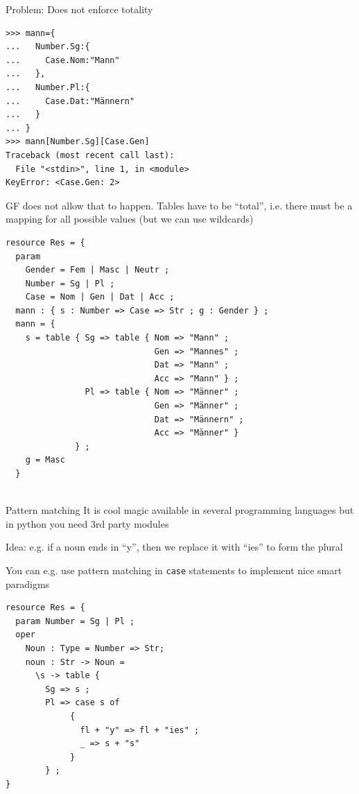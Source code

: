 \documentclass{beamer}
\begin{document}
\begin{frame}[fragile]
Problem: Does not enforce totality
\begin{verbatim}
>>> mann={
...   Number.Sg:{
...     Case.Nom:"Mann"
...   },
...   Number.Pl:{
...     Case.Dat:"Männern"
...   }
... }
>>> mann[Number.Sg][Case.Gen]
Traceback (most recent call last):
  File "<stdin>", line 1, in <module>
KeyError: <Case.Gen: 2>
\end{verbatim}
GF does not allow that to happen. Tables have to be ``total'', i.e. there must be a mapping for all possible values (but we can use wildcards)
\end{frame}

\begin{frame}[fragile]
  \begin{lstlisting}
resource Res = {
  param
    Gender = Fem | Masc | Neutr ;
    Number = Sg | Pl ;
    Case = Nom | Gen | Dat | Acc ;
  mann : { s : Number => Case => Str ; g : Gender } ;
  mann = {
    s = table { Sg => table { Nom => "Mann" ;
                              Gen => "Mannes" ;
                              Dat => "Mann" ;
                              Acc => "Mann" } ;
                Pl => table { Nom => "Männer" ;
                              Gen => "Männer" ;
                              Dat => "Männern" ;
                              Acc => "Männer" }
              } ;
    g = Masc
  }
    
  \end{lstlisting}
\end{frame}

\begin{frame}{Pattern matching}
  It is cool magic available in several programming languages but in python you need 3rd party modules

  Idea: e.g. if a noun ends in ``y'', then we replace it with ``ies'' to form the plural

  You can e.g. use pattern matching in \texttt{case} statements to implement nice smart paradigms
\end{frame}

\begin{frame}[fragile]
  \begin{lstlisting}
resource Res = {
  param Number = Sg | Pl ;
  oper
    Noun : Type = Number => Str;
    noun : Str -> Noun =
      \s -> table {
        Sg => s ; 
        Pl => case s of
             { 
               fl + "y" => fl + "ies" ;
               _ => s + "s"
             }
        } ;
}

  \end{lstlisting}
\end{frame}
\end{document}

